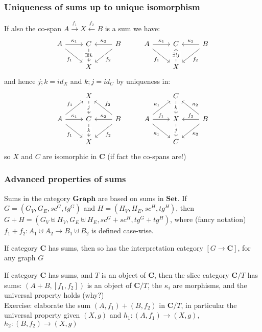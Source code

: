 \documentclass[handout]{beamer}
\newcommand{\bfsf}[1]{{\boldsymbol{#1}}}
\newcommand{\Set}{\bfsf{Set}}
\newcommand{\Gra}{\bfsf{Graph}}
\newcommand{\CC}{\bfsf{C}}
\begin{document}
\frame
  {   
    \frametitle{Uniqueness of sums up to unique isomorphism}\label{Ch4:SumUnique}

If also the co-span $A\stackrel{f_1}{\to} X \stackrel{f_2}{\leftarrow}B$
is a sum we have:
\[
\begin{tikzcd}[ampersand replacement=\&]
A \arrow{r}{\kappa_1} \arrow[swap]{dr}{f_1}\&
C\arrow{d}[description]{\exists!k} \& 
B \arrow[swap]{l}{\kappa_2}\arrow{dl}{f_2} \&
A \arrow{r}{\kappa_1} \arrow[swap]{dr}{f_1}\&
C \& 
B \arrow[swap]{l}{\kappa_2}\arrow{dl}{f_2} \\
\& X\&\& \&
X\arrow{u}[description]{\exists!j}
\end{tikzcd}
\]
and hence $j;k = id_X$ and $k;j = id_C$ by uniqueness in: %
\[
\begin{tikzcd}[ampersand replacement=\&]
\& X\arrow{d}[description]{j}\&\& \&
C\arrow{d}[description]{k}\\
A \arrow{r}{\kappa_1} \arrow[swap]{dr}{f_1} \arrow{ur}{f_1}\&
C\arrow{d}[description]{k} \& 
B \arrow[swap]{l}{\kappa_2}\arrow{dl}{f_2} \arrow[swap]{ul}{f_2}\&
A \arrow{ru}{\kappa_1} \arrow{r}{f_1} \arrow[swap]{dr}{\kappa_1}\&
X \arrow{d}[description]{j}\& 
B \arrow[swap]{l}{f_2}\arrow{dl}{\kappa_2} \arrow[swap]{ul}{\kappa_2}\\
\& X\&\& \&
C%
\end{tikzcd}
\]
so $X$ and $C$ are isomorphic in $\CC$ (if fact the co-spans are!)

 }

\frame
  {   
    \frametitle{Advanced properties of sums}\label{Ch4:SumPropAdv}

Sums in the category $\Gra$ are based on sums in $\Set$.
If $G=(G_V,G_E,sc^G,tg^G)$ and $H=(H_V,H_E,sc^H,tg^H)$,
then $G+H  = (G_V \uplus H_V,G_E \uplus H_E,sc^G{+}sc^H,tg^G{+}tg^H)$,
where (fancy notation) $f_1{+}f_2 : A_1\uplus A_2 \to B_1\uplus B_2$ is defined case-wise.\\\vspace*{0.3cm}

If category $\CC$ has sums, then so has the interpretation category
$[G\to\CC]$, for any graph $G$\\\vspace*{0.3cm}

If category $\CC$ has sums, and $T$ is an object of $\CC$, then the slice category
$\CC/T$ has sums: $(A+B, [f_1,f_2])$ is an object of $\CC/T$,
the $\kappa_i$ are morphisms, and the universal property holds ({\color{red}why?})
\\\vspace*{0.3cm}
Exercise: elaborate the sum $(A,f_1)+(B,f_2)$ in $\CC/T$,
in particular the universal property given $(X,g)$ and $h_1: (A,f_1)\to(X,g)$,
$h_2: (B,f_2)\to(X,g)$


 }
\end{document}

